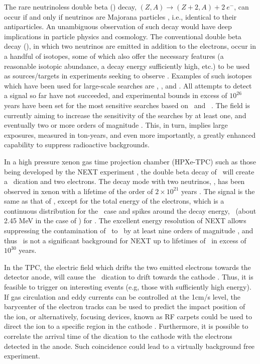 \documentclass[aps,prl,reprint,longbibliography,superscriptaddress, english]{revtex4-1}
\begin{document}
The rare neutrinoless double beta  (\bbonu) decay, $(Z,A) \rightarrow (Z+2,A) + 2\ e^{-}$, can occur if and only if neutrinos are Majorana particles \cite{Majorana:1937}, i.e., identical to their antiparticles. An unambiguous observation of such decay would have deep implications in particle physics and cosmology\cite{Sakharov1967,Fukugita:1986hr, GellMann:1980vs, Yanagida:1979as, Mohapatra:1979ia}. 
The conventional double beta decay (\bbtnu), in which two neutrinos are emitted in addition to the electrons, occur in a handful of isotopes, some of which also offer the necessary features (a reasonable isotopic abundance, a decay energy sufficiently high, etc.) to be used as sources/targets in experiments seeking to observe \bbonu. Examples of such isotopes which have been used for large-scale searches are \GE, \TE, and \XE. All attempts to detect a signal so far have not succeeded, and experimental bounds in excess of $10^{26}$ years have been set for the most sensitive searches based on \XE\ and \GE\ \cite{Gando:2016ji, Agostini:2018tnm}.
The field is currently aiming to increase the sensitivity of the searches by at least one, and eventually two or more orders of magnitude \cite{Gomez-Cadenas:2019sfa}. This, in turn, implies large exposures, measured in ton-years, and even more importantly, a greatly enhanced capability to suppress radioactive backgrounds. 

In a high pressure xenon gas time projection chamber (HPXe-TPC) such as those being developed by the NEXT experiment \cite{Martin-Albo:2015rhw, NEXT:2020amj}, the double beta decay of \XE\ will create a \Bapp\ dication and two electrons.
The decay mode with two neutrinos, \bbtnu, has been observed in xenon with a lifetime of the order of $2 \times 10^{21}$ years \cite{Ackerman:2011gz}. The  signal is the same as that of \bbonu, except for the total energy of the electrons, which is a continuous distribution for the \bbtnu\ case and spikes around the decay energy, \Qbb\ (about 2.45 MeV in the case of \XE) for \cite{Martin-Albo:2015rhw}. The excellent energy resolution of NEXT allows suppressing the contamination of \bbtnu\ to \bbonu\ by at least nine orders of magnitude \cite{ALVAREZ2013101,Renner:2019pfe}, and thus \bbtnu\ is not a significant background for NEXT up to lifetimes of \bbonu\ in excess of $10^{30}$ years. 

In the TPC, the electric field which drifts the two emitted electrons towards the detector anode, will cause the \Bapp\ dication to drift towards the cathode \cite{Bainglass:2018odn}. Thus, it is feasible to trigger on interesting events (e.g, those with sufficiently high energy). If gas circulation and eddy currents can be controlled at the 1cm/s level, the barycenter of the electron tracks can be used to predict the impact position of the ion, or alternatively, focusing devices, known as RF carpets could be used to direct the ion to a specific region in the cathode \cite{NEXT:2021idl}. Furthermore, it is possible to correlate the arrival time of the dication to the cathode with the electrons detected in the anode. Such coincidence could lead to a virtually background free experiment. 
\end{document}
